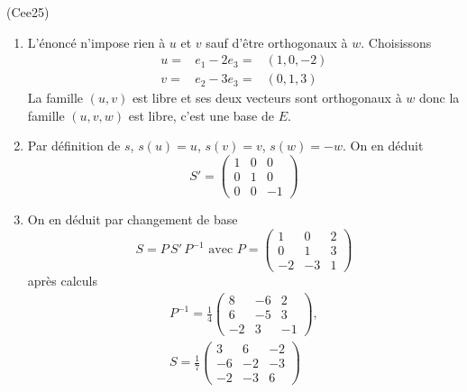 \begin{tiny}(Cee25)\end{tiny}
\begin{enumerate}
 \item L'énoncé n'impose rien à $u$ et $v$ sauf d'être orthogonaux à $w$. Choisissons
\begin{displaymath}
\begin{array}{ccc}
 u =& e_1 - 2e_3 =& (1,0,-2) \\
 v =& e_2 - 3e_3 =& (0,1,3)
\end{array} 
\end{displaymath}
La famille $(u,v)$ est libre et ses deux vecteurs sont orthogonaux à $w$ donc la famille $(u,v,w)$ est libre, c'est une base de $E$.
\item Par définition de $s$, $s(u)=u$, $s(v)=v$, $s(w)=-w$. On en déduit
\begin{displaymath}
 S'=
\begin{pmatrix}
 1 & 0 & 0 \\ 0 & 1 & 0 \\ 0 & 0 & -1
\end{pmatrix}
\end{displaymath}
\item On en déduit par changement de base
\begin{displaymath}
 S = P\,S' \,P^{-1} \text{ avec }
P=
\begin{pmatrix}
 1 & 0 & 2 \\0 & 1 & 3 \\ -2 & -3 & 1
\end{pmatrix}
\end{displaymath}
après calculs
\begin{multline*}
 P^{-1}= \frac{1}{4}
\begin{pmatrix}
 8 & -6 & 2 \\ 6 & -5 & 3 \\ -2 & 3 & -1
\end{pmatrix}, \\
S = \frac{1}{7}
\begin{pmatrix}
3 & 6 & -2 \\ -6 & -2 & -3 \\ -2 & -3 & 6 
\end{pmatrix}
\end{multline*}

\end{enumerate}
